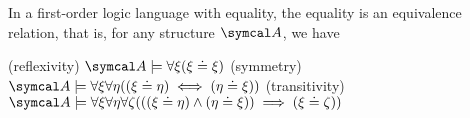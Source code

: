 \begin{proposition}\label{thm:first_order_equality_is_equivalence_relation}
  In a first-order logic language with equality, the equality is an equivalence relation, that is, for any structure \( \Cal{A} \), we have
  \begin{description}
    (reflexivity) \( \Cal{A} \models \forall \xi (\xi \doteq \xi) \)
    (symmetry) \( \Cal{A} \models \forall \xi \forall \eta ((\xi \doteq \eta) \iff (\eta \doteq \xi)) \)
    (transitivity) \( \Cal{A} \models \forall \xi \forall \eta \forall \zeta (((\xi \doteq \eta) \land (\eta \doteq \xi)) \implies (\xi \doteq \zeta)) \)
  \end{description}
\end{proposition}
